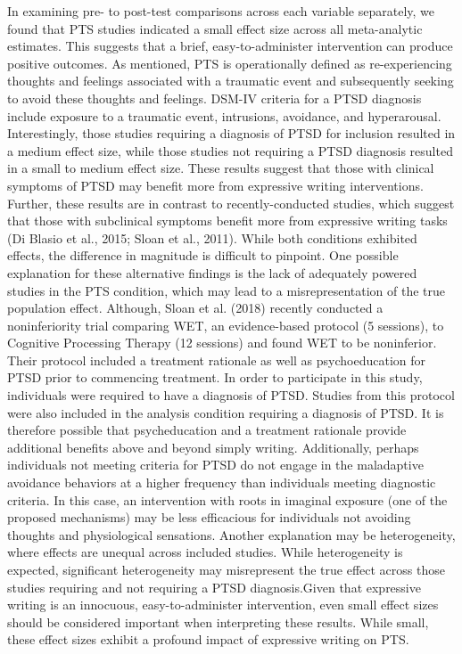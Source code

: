 \documentclass[man]{apa6}
\theoremstyle{definition}
\theoremstyle{definition}
\theoremstyle{definition}
\theoremstyle{remark}
\begin{document}
In examining pre- to post-test comparisons across each variable
separately, we found that PTS studies indicated a small effect size
across all meta-analytic estimates. This suggests that a brief,
easy-to-administer intervention can produce positive outcomes. As
mentioned, PTS is operationally defined as re-experiencing thoughts and
feelings associated with a traumatic event and subsequently seeking to
avoid these thoughts and feelings. DSM-IV criteria for a PTSD diagnosis
include exposure to a traumatic event, intrusions, avoidance, and
hyperarousal. Interestingly, those studies requiring a diagnosis of PTSD
for inclusion resulted in a medium effect size, while those studies not
requiring a PTSD diagnosis resulted in a small to medium effect size.
These results suggest that those with clinical symptoms of PTSD may
benefit more from expressive writing interventions. Further, these
results are in contrast to recently-conducted studies, which suggest
that those with subclinical symptoms benefit more from expressive
writing tasks (Di Blasio et al., 2015; Sloan et al., 2011). While both
conditions exhibited effects, the difference in magnitude is difficult
to pinpoint. One possible explanation for these alternative findings is
the lack of adequately powered studies in the PTS condition, which may
lead to a misrepresentation of the true population effect. Although,
Sloan et al. (2018) recently conducted a noninferiority trial comparing
WET, an evidence-based protocol (5 sessions), to Cognitive Processing
Therapy (12 sessions) and found WET to be noninferior. Their protocol
included a treatment rationale as well as psychoeducation for PTSD prior
to commencing treatment. In order to participate in this study,
individuals were required to have a diagnosis of PTSD. Studies from this
protocol were also included in the analysis condition requiring a
diagnosis of PTSD. It is therefore possible that psycheducation and a
treatment rationale provide additional benefits above and beyond simply
writing. Additionally, perhaps individuals not meeting criteria for PTSD
do not engage in the maladaptive avoidance behaviors at a higher
frequency than individuals meeting diagnostic criteria. In this case, an
intervention with roots in imaginal exposure (one of the proposed
mechanisms) may be less efficacious for individuals not avoiding
thoughts and physiological sensations. Another explanation may be
heterogeneity, where effects are unequal across included studies. While
heterogeneity is expected, significant heterogeneity may misrepresent
the true effect across those studies requiring and not requiring a PTSD
diagnosis.Given that expressive writing is an innocuous,
easy-to-administer intervention, even small effect sizes should be
considered important when interpreting these results. While small, these
effect sizes exhibit a profound impact of expressive writing on PTS.
\end{document}
